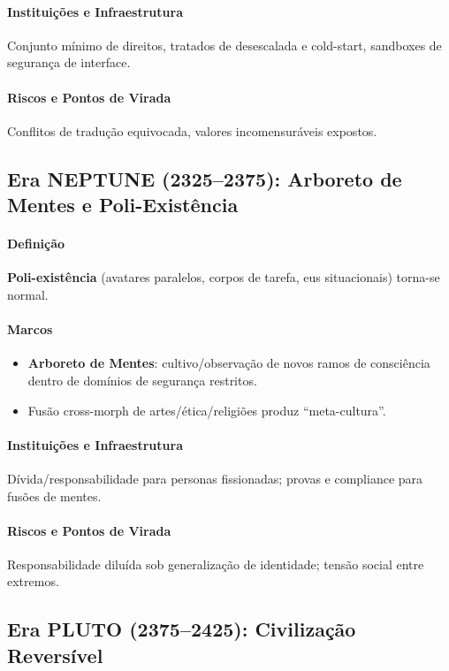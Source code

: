 \documentclass[11pt]{article}
\begin{document}
\begin{itemize}[noitemsep]
\begin{itemize}[noitemsep]
\begin{itemize}[noitemsep]
\paragraph{Instituições e Infraestrutura} Conjunto mínimo de direitos, tratados de desescalada e cold-start, sandboxes de segurança de interface.

\paragraph{Riscos e Pontos de Virada} Conflitos de tradução equivocada, valores incomensuráveis expostos.

\subsection{Era NEPTUNE (2325–2375): Arboreto de Mentes e Poli-Existência}
\paragraph{Definição} \textbf{Poli-existência} (avatares paralelos, corpos de tarefa, eus situacionais) torna-se normal.

\paragraph{Marcos}
\begin{itemize}[noitemsep]
  \item \textbf{Arboreto de Mentes}: cultivo/observação de novos ramos de consciência dentro de domínios de segurança restritos.
  \item Fusão cross-morph de artes/ética/religiões produz ``meta-cultura''.
\end{itemize}

\paragraph{Instituições e Infraestrutura} Dívida/responsabilidade para personas fissionadas; provas e compliance para fusões de mentes.

\paragraph{Riscos e Pontos de Virada} Responsabilidade diluída sob generalização de identidade; tensão social entre extremos.

\subsection{Era PLUTO (2375–2425): Civilização Reversível}

\end{itemize}
\end{itemize}
\end{itemize}
\end{document}
